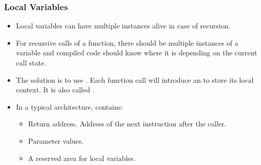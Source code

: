 \begin{frame}
\frametitle{Local Variables}
\begin{itemize}[<+->]
\item Local variables can have multiple instances alive in case of recursion. 
\item For recursive calls of a function, there should be multiple instances of a variable and compiled code should know where it is depending on the current call state.
\item The solution is to use . Each function call will introduce an  to store its local context. It is also called .
\item In a typical architecture,  contains:
	\begin{itemize}
	\item Return address. Address of the next instruction after the caller.
	\item Parameter values.
	\item A reserved area for local variables.
	\end{itemize}
\end{itemize}
\end{frame}

